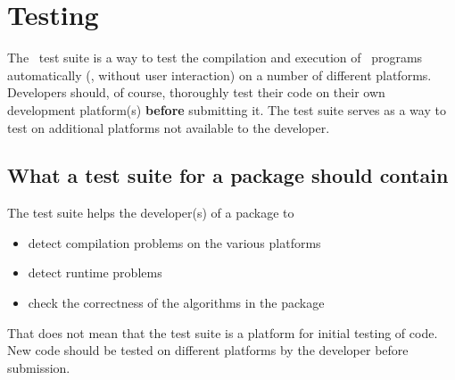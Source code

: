 
\chapter{Testing\label{chap:testing}}



The \cgal\ test suite is a way to test the compilation and execution of \cgal\ 
programs automatically (\ie, without user interaction) on a number of 
different platforms.  Developers should, of course, thoroughly test their 
code on their own development platform(s) \textbf{before} submitting it.
The test suite serves as a way to test on additional platforms not available
to the developer.  

\section{What a test suite for a package should contain\label{sec:whats_in_test_suite}}

The test suite helps the developer(s) of a package to 
\begin{itemize}
\item detect compilation problems on the various platforms
\item detect runtime problems
\item check the correctness of the algorithms in the package
\end{itemize}

That does not mean that the test suite is a platform for initial testing of 
code.  New code should be tested on different platforms by the developer
before submission.

